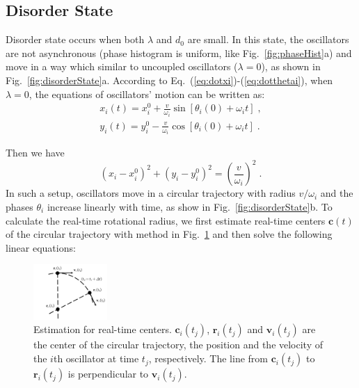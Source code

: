 \documentclass[%
 aip,
 amsmath,amssymb,
 reprint,%
]{revtex4-1}
\begin{document}
\subsection{Disorder State}

Disorder state occurs when both $\lambda$ and $d_0$ are small. In this state, the oscillators are not asynchronous (phase histogram is uniform, like Fig.~\ref{fig:phaseHist}a) and move in a way which similar to uncoupled oscillators ($\lambda=0$), as shown in Fig.~\ref{fig:disorderState}a. According to Eq.~(\ref{eq:dotxi})-(\ref{eq:dotthetai}), when $\lambda=0$, the equations of oscillators' motion can be written as:
\begin{eqnarray}
    x_i\left( t \right) =x_{i}^{0}+\frac{v}{\omega _i}\sin \left[ \theta _i\left( 0 \right) +\omega _it \right] \;,\label{eq:circlemotionx}\\
    y_i\left( t \right) =y_{i}^{0}-\frac{v}{\omega _i}\cos \left[ \theta _i\left( 0 \right) +\omega _it \right] \;.
\end{eqnarray}

Then we have
\begin{equation}
    \left( x_i -x_{i}^{0} \right) ^2+\left( y_i -y_{i}^{0} \right) ^2=\left( \frac{v}{\omega _i} \right) ^2\;.
\end{equation}
In such a setup, oscillators move in a circular trajectory with radius $v/\omega _i$ and the phases $\theta_i$ increase linearly with time, as show in Fig.~\ref{fig:disorderState}b. To calculate the real-time rotational radius, we first estimate real-time centers $\mathbf{c}(t)$ of the circular trajectory with method in Fig.~\ref{fig:CenterEps} and then solve the following linear equations:

\begin{figure}[b]
    \includegraphics[width=0.25\textwidth]{./figs/CenterEps.pdf}
    \caption{\label{fig:CenterEps} Estimation for real-time centers.
    $\mathbf{c}_i(t_j)$, $\mathbf{r}_i(t_j)$ and $\mathbf{v}_i(t_j)$ are the center of the circular trajectory, the position and the velocity of the $i$th oscillator at time $t_j$, respectively.
    The line from $\mathbf{c}_i(t_j)$ to $\mathbf{r}_i(t_j)$ is perpendicular to $\mathbf{v}_i(t_j)$.}
\end{figure}
\end{document}
